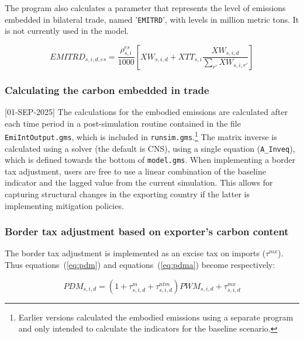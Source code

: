 \documentclass[11pt,letterpaper]{report}
\begin{document}


The program also calculates a parameter that represents the level of emissions embedded in bilateral
trade, named '\texttt{EMITRD}', with levels in million metric tons.
It is not currently used in the model.

\[
\mathit{EMITRD}_{s,i,d,\mathit{es}} =
\frac{\rho^{\mathit{es}}_{s,i}}{1000}
\left[
\mathit{XW}_{s,i,d} + \mathit{XTT}_{s,i}
\frac{\mathit{XW}_{s,i,d}}
{\displaystyle \sum_{r'} \mathit{XW}_{s,i,r'}}
\right]
\]

\subsubsection{Calculating the carbon embedded in trade}

[01-SEP-2025] The calculations for the embodied
emissions are calculated after each time period
in a post-simulation routine contained in the file
\texttt{EmiIntOutput.gms}, which is included in
\texttt{runsim.gms}.\footnote{Earlier
versions calculated the embodied emissions
using a separate program and only intended
to calculate the indicators for the baseline
scenario.} The matrix inverse is calculated
using a solver (the default is CNS), using
a single equation (\texttt{A\_Inveq}), which
is defined towards the bottom of \texttt{model.gms}.
When implementing a border tax adjustment, users
are free to use a linear combination
of the baseline indicator and the lagged value
from the current simulation. This allows
for capturing structural changes in the exporting
country if the latter is implementing mitigation
policies.

\subsubsection{Border tax adjustment based on exporter's carbon content}

The border tax adjustment is implemented as
an excise tax on imports ($\tau^\mathit{mx}$).
Thus equations~(\ref{eq:pdm}) and equations~(\ref{eq:pdma})  become respectively:

\begin{equation}
\label{eq:pdmx}
\mathit{PDM}_{s,i,d} = \left( 1 + \tau^m_{s,i,d}  + \tau^{\mathit{ntm}}_{s,i,d} \right) \mathit{PWM}_{s,i,d}
+ \tau^\mathit{mx}_{s,i,d}
\end{equation}
\end{document}
